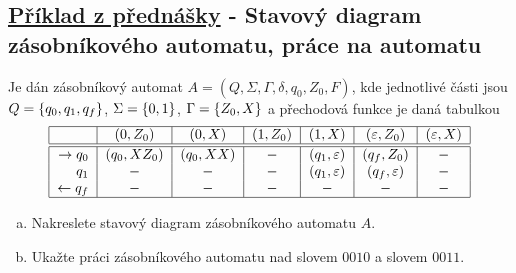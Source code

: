 \subsection{\href{https://youtu.be/UfLaDffSpQU?list=PLQL6z4JeTTQkLuzI78OTnfYBclE1g0UjS&t=3519}{Příklad z přednášky} - Stavový diagram zásobníkového automatu, práce na automatu}
Je dán zásobníkový automat $A = (Q, \Sigma, \Gamma, \delta, q_0, Z_0, F)$, kde jednotlivé části jsou 
$Q = \left\lbrace q_0, q_1, q_f \right\rbrace$, $\Sigma = \left\lbrace 0,1 \right\rbrace$, $\Gamma =\left\lbrace Z_0, X \right\rbrace$ a přechodová funkce je daná tabulkou
\[
\begin{tabular}{|r|c|c|c|c|c|c|}
    \hline
    & $(0, Z_0)$ & $(0, X)$ & $(1, Z_0)$ & $(1, X)$ & $(\varepsilon, Z_0)$ & $(\varepsilon, X)$ \\ \hline \hline
    $\rightarrow q_0$& $(q_0, X Z_0)$ & $(q_0, XX)$ & $-$ & $(q_1, \varepsilon)$ & $(q_f, Z_0)$ & $-$ \\
    $q_1$            & $-$            & $-$         & $-$ & $(q_1, \varepsilon)$ & $(q_f, \varepsilon)$ & $-$ \\
    $\leftarrow q_f$ & $-$& $-$& $-$ & $-$ & $-$ & $-$\\
    \hline
\end{tabular}
\]
\begin{enumerate}[a), noitemsep]
    \item Nakreslete stavový diagram zásobníkového automatu $A$.
    \item Ukažte práci zásobníkového automatu nad slovem $0010$ a slovem $0011$.
\end{enumerate}

